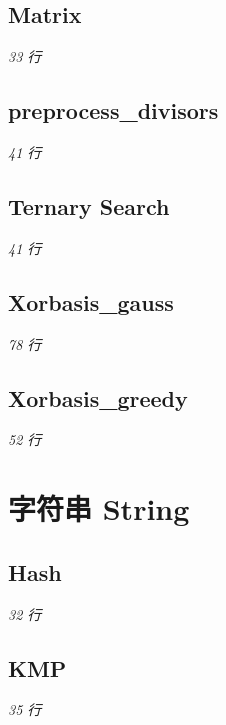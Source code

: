 \documentclass[12pt, UTF8]{ctexart}
\begin{document}
\subsection{Matrix}\hfill\normalsize\textit{33 行}



\subsection{preprocess\_divisors}\hfill\normalsize\textit{41 行}



\subsection{Ternary Search}\hfill\normalsize\textit{41 行}



\subsection{Xorbasis\_gauss}\hfill\normalsize\textit{78 行}



\subsection{Xorbasis\_greedy}\hfill\normalsize\textit{52 行}



\section{字符串 String}

\subsection{Hash}\hfill\normalsize\textit{32 行}



\subsection{KMP}\hfill\normalsize\textit{35 行}


\end{document}
